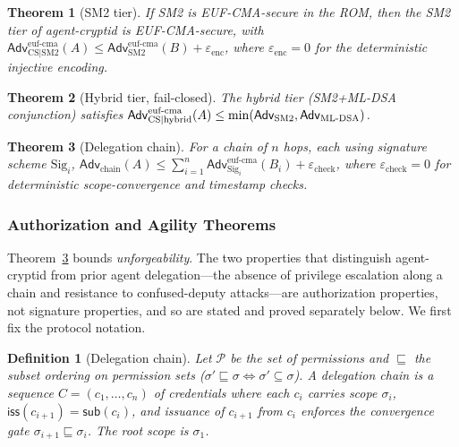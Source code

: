 \documentclass[10pt,twocolumn]{IEEEtran}
\newtheorem{theorem}{Theorem}
\newtheorem{definition}{Definition}
\begin{document}
\begin{theorem}[SM2 tier]
  \label{thm:sm2}
  If SM2 is EUF-CMA-secure in the ROM, then the SM2 tier of agent-cryptid
  is EUF-CMA-secure, with
  $\mathsf{Adv}^{\text{euf-cma}}_{\text{CS|SM2}}(A) \leq
  \mathsf{Adv}^{\text{euf-cma}}_{\text{SM2}}(B) + \varepsilon_{\text{enc}}$,
  where $\varepsilon_{\text{enc}} = 0$ for the deterministic injective
  encoding.
\end{theorem}

\begin{theorem}[Hybrid tier, fail-closed]
  \label{thm:hybrid}
  The hybrid tier (SM2+ML-DSA conjunction) satisfies
  $\mathsf{Adv}^{\text{euf-cma}}_{\text{CS|hybrid}}(A) \leq
  \min(\mathsf{Adv}_{\text{SM2}}, \mathsf{Adv}_{\text{ML\text{-}DSA}})$.
\end{theorem}

\begin{theorem}[Delegation chain]
  \label{thm:chain}
  For a chain of $n$ hops, each using signature scheme $\text{Sig}_i$,
  $\mathsf{Adv}_{\text{chain}}(A) \leq \sum_{i=1}^{n}
  \mathsf{Adv}^{\text{euf-cma}}_{\text{Sig}_i}(B_i) + \varepsilon_{\text{check}}$,
  where $\varepsilon_{\text{check}} = 0$ for deterministic scope-convergence
  and timestamp checks.
\end{theorem}

\subsubsection{Authorization and Agility Theorems}

Theorem~\ref{thm:chain} bounds \emph{unforgeability}. The two properties
that distinguish agent-cryptid from prior agent delegation---the absence
of privilege escalation along a chain and resistance to confused-deputy
attacks---are authorization properties, not signature properties, and so
are stated and proved separately below. We first fix the protocol
notation.

\begin{definition}[Delegation chain]
  \label{def:chain}
  Let $\mathcal{P}$ be the set of permissions and $\sqsubseteq$ the
  subset ordering on permission sets ($\sigma' \sqsubseteq \sigma \iff
  \sigma' \subseteq \sigma$). A delegation chain is a sequence
  $C = (c_1, \dots, c_n)$ of credentials where each $c_i$ carries scope
  $\sigma_i$, $\mathsf{iss}(c_{i+1}) = \mathsf{sub}(c_i)$, and issuance
  of $c_{i+1}$ from $c_i$ enforces the convergence gate
  $\sigma_{i+1} \sqsubseteq \sigma_i$. The root scope is $\sigma_1$.
\end{definition}
\end{document}
